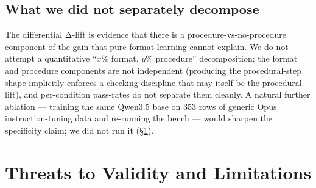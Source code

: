 \documentclass[10pt]{article}
\begin{document}
\subsection{What we did not separately decompose}
The differential Δ-lift is evidence that there is a procedure-vs-no-procedure component of the gain that pure format-learning cannot explain. We do not attempt a quantitative ``$x\%$ format, $y\%$ procedure'' decomposition: the format and procedure components are not independent (producing the procedural-step shape implicitly enforces a checking discipline that may itself be the procedural lift), and per-condition pass-rates do not separate them cleanly. A natural further ablation --- training the same Qwen3.5 base on 353 rows of generic Opus instruction-tuning data and re-running the bench --- would sharpen the specificity claim; we did not run it (\S\ref{sec:threats}).

\section{Threats to Validity and Limitations}\label{sec:threats}
\end{document}
